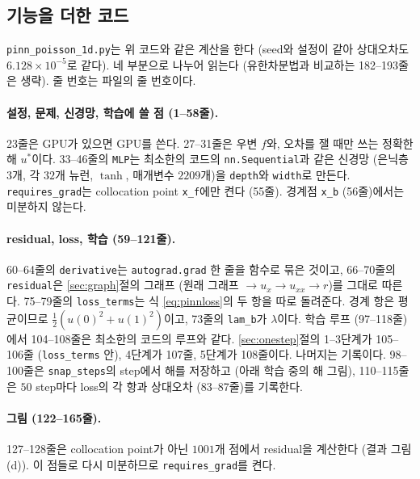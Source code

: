 \documentclass[11pt,a4paper]{article}
\begin{document}
\subsection{기능을 더한 코드}

\texttt{pinn\_poisson\_1d.py}는 위 코드와 같은 계산을 한다 (seed와 설정이 같아 상대오차도 $6.128\times10^{-5}$로 같다).
네 부분으로 나누어 읽는다 (유한차분법과 비교하는 182--193줄은 생략). 줄 번호는 파일의 줄 번호이다.

\paragraph{설정, 문제, 신경망, 학습에 쓸 점 (1--58줄).}

23줄은 GPU가 있으면 GPU를 쓴다. 27--31줄은 우변 $f$와, 오차를 잴 때만 쓰는 정확한 해 $u^*$이다.
33--46줄의 \texttt{MLP}는 최소한의 코드의 \texttt{nn.Sequential}과 같은 신경망 (은닉층 $3$개, 각 $32$개 뉴런, $\tanh$, 매개변수 $2209$개)을
\texttt{depth}와 \texttt{width}로 만든다.
\texttt{requires\_grad}는 collocation point \texttt{x\_f}에만 켠다 (55줄). 경계점 \texttt{x\_b} (56줄)에서는 미분하지 않는다.

\paragraph{residual, loss, 학습 (59--121줄).}

60--64줄의 \texttt{derivative}는 \texttt{autograd.grad} 한 줄을 함수로 묶은 것이고,
66--70줄의 \texttt{residual}은 \ref{sec:graph}절의 그래프 (원래 그래프 $\to u_x\to u_{xx}\to r$)를 그대로 따른다.
75--79줄의 \texttt{loss\_terms}는 식 \eqref{eq:pinnloss}의 두 항을 따로 돌려준다. 경계 항은 평균이므로 $\frac12(u(0)^2+u(1)^2)$이고, 73줄의 \texttt{lam\_b}가 $\lambda$이다.
학습 루프 (97--118줄)에서 104--108줄은 최소한의 코드의 루프와 같다. \ref{sec:onestep}절의 1--3단계가 105--106줄 (\texttt{loss\_terms} 안), 4단계가 107줄, 5단계가 108줄이다.
나머지는 기록이다. 98--100줄은 \texttt{snap\_steps}의 step에서 해를 저장하고 (아래 학습 중의 해 그림), 110--115줄은 $50$ step마다 loss의 각 항과 상대오차 (83--87줄)를 기록한다.

\paragraph{그림 (122--165줄).}

127--128줄은 collocation point가 아닌 $1001$개 점에서 residual을 계산한다 (결과 그림 (d)). 이 점들로 다시 미분하므로 \texttt{requires\_grad}를 켠다.
\end{document}
